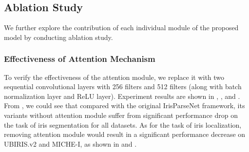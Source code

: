 \documentclass[journal]{IEEEtran}
\begin{document}
\subsection{Ablation Study}
\label{sec:ablation}
We further explore the contribution of each individual module of the proposed model by conducting ablation study.

\subsubsection{Effectiveness of Attention Mechanism}
To verify the effectiveness of the attention module, we replace it with two sequential convolutional layers with 256 filters and 512 filters (along with batch normalization layer and ReLU layer).
Experiment results are shown in , , and .
From , we could see that compared with the original IrisParseNet framework, its variants without attention module suffer from significant performance drop on the task of iris segmentation for all datasets.
As for the task of iris localization, removing attention module would result in a significant performance decrease on UBIRIS.v2 and MICHE-I, as shown in  and .
\end{document}
